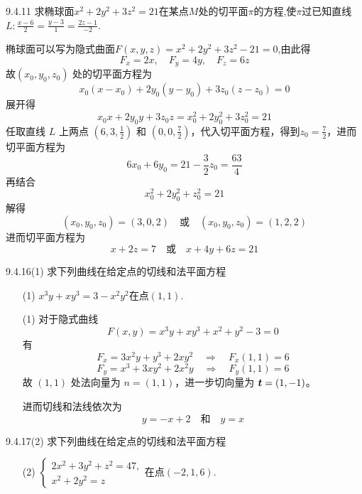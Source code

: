 \begin{exercise}{9.4.11}
求椭球面$x^2+2y^2+3z^2 = 21$在某点$M$处的切平面$\pi$的方程,使$\pi$过已知直线$L:\frac{x-6}{2} = \frac{y-3}{1} = \frac{2z-1}{-2}$.
\end{exercise}

\begin{solution}
    椭球面可以写为隐式曲面$F(x, y, z) = x^2 + 2y^2 + 3z^2 - 21 = 0$,由此得$$F_x = 2x, \quad F_y = 4y, \quad F_z = 6z$$
    故$(x_0, y_0, z_0)$ 处的切平面方程为
\[
x_0(x - x_0) + 2y_0(y - y_0) + 3z_0(z - z_0) = 0
\]
展开得
\[
x_0x + 2y_0y + 3z_0z = x_0^2 + 2y_0^2 + 3z_0^2 = 21
\]
任取直线 $L$ 上两点 $(6, 3, \frac{1}{2})$ 和 $(0, 0, \frac{7}{2})$，代入切平面方程，得到$z_0 = \frac{7}{2}$，进而切平面方程为
\[
6x_0 + 6y_0 = 21 - \frac{3}{2} z_0 = \frac{63}{4}
\]
再结合
\[
x_0^2 + 2y_0^2 + z_0^2 = 21
\]
解得
\[
(x_0, y_0, z_0) = (3, 0, 2) \quad \text{或} \quad (x_0, y_0, z_0) = (1, 2, 2)
\]
进而切平面方程为
\[
x + 2z = 7 \quad \text{或} \quad x + 4y + 6z = 21
\]
\end{solution}

\begin{exercise}{9.4.16(1)}
求下列曲线在给定点的切线和法平面方程
\begin{enumerate}
    \item[(1)] $x^3y+xy^3 =3 - x^2y^2$在点$(1,1)$.
\end{enumerate}
\end{exercise}

\begin{solution}
    \begin{enumerate}
        \item[(1)] 对于隐式曲线
        \[
        F(x, y) = x^3y + xy^3 + x^2 + y^2 - 3 = 0
        \]
        有
        \[
        F_x = 3x^2y + y^3 + 2xy^2 \quad \Rightarrow \quad F_x(1, 1) = 6
        \]
        \[
        F_y = x^3 + 3xy^2 + 2x^2y \quad \Rightarrow \quad F_y(1, 1) = 6
        \]
        故 $(1, 1)$ 处法向量为 $n = (1, 1)$，进一步切向量为 $\bm{t} = (1, -1)$。

        进而切线和法线依次为
        \[
        y = -x + 2 \quad \text{和} \quad y = x
        \]
    \end{enumerate}
\end{solution}

\begin{exercise}{9.4.17(2)}
求下列曲线在给定点的切线和法平面方程
\begin{enumerate}
    \item[(2)] $\begin{cases}
        2x^2 + 3y^2 + z^2 = 47,\\
        x^2 + 2y^2 =z
    \end{cases}$在点$(-2,1,6)$.
\end{enumerate}
\end{exercise}

